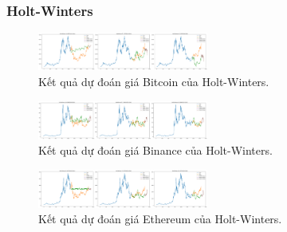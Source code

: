 \documentclass[conference]{IEEEtran}
\begin{document}
\subsubsection{Holt-Winters}
\begin{figure}[H]
    \centering
    \includegraphics[width=0.5\textwidth]{bibliography/pictures/HWbtc.png}
    \caption{Kết quả dự đoán giá Bitcoin của Holt-Winters.}
\end{figure}
\begin{figure}[H]
    \centering
    \includegraphics[width=0.5\textwidth]{bibliography/pictures/HWbnb.png}
    \caption{Kết quả dự đoán giá Binance của Holt-Winters.}
\end{figure}
\begin{figure}[H]
    \centering
    \includegraphics[width=0.5\textwidth]{bibliography/pictures/HWeth.png}
    \caption{Kết quả dự đoán giá Ethereum của Holt-Winters.}
\end{figure}
\clearpage
\end{document}
